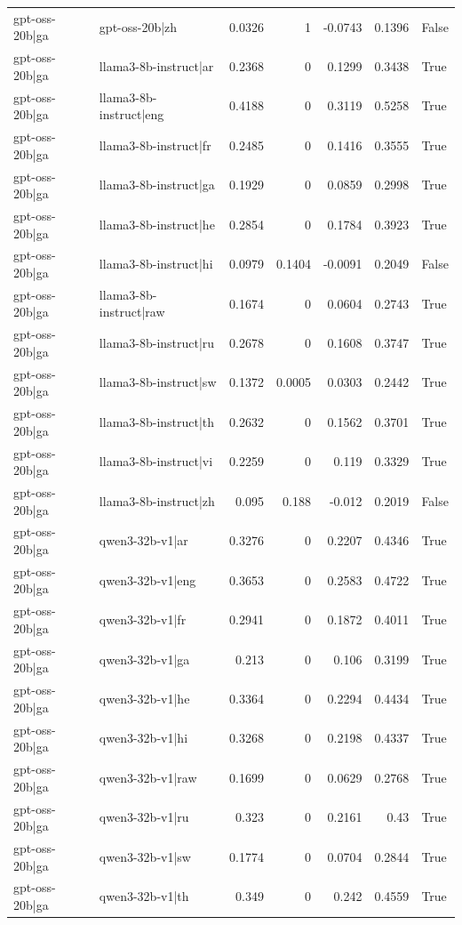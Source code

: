 \begin{table}
\begin{tabular}{l l r r r r l}
gpt-oss-20b|ga & gpt-oss-20b|zh & 0.0326 & 1 & -0.0743 & 0.1396 & False \\
gpt-oss-20b|ga & llama3-8b-instruct|ar & 0.2368 & 0 & 0.1299 & 0.3438 & True \\
gpt-oss-20b|ga & llama3-8b-instruct|eng & 0.4188 & 0 & 0.3119 & 0.5258 & True \\
gpt-oss-20b|ga & llama3-8b-instruct|fr & 0.2485 & 0 & 0.1416 & 0.3555 & True \\
gpt-oss-20b|ga & llama3-8b-instruct|ga & 0.1929 & 0 & 0.0859 & 0.2998 & True \\
gpt-oss-20b|ga & llama3-8b-instruct|he & 0.2854 & 0 & 0.1784 & 0.3923 & True \\
gpt-oss-20b|ga & llama3-8b-instruct|hi & 0.0979 & 0.1404 & -0.0091 & 0.2049 & False \\
gpt-oss-20b|ga & llama3-8b-instruct|raw & 0.1674 & 0 & 0.0604 & 0.2743 & True \\
gpt-oss-20b|ga & llama3-8b-instruct|ru & 0.2678 & 0 & 0.1608 & 0.3747 & True \\
gpt-oss-20b|ga & llama3-8b-instruct|sw & 0.1372 & 0.0005 & 0.0303 & 0.2442 & True \\
gpt-oss-20b|ga & llama3-8b-instruct|th & 0.2632 & 0 & 0.1562 & 0.3701 & True \\
gpt-oss-20b|ga & llama3-8b-instruct|vi & 0.2259 & 0 & 0.119 & 0.3329 & True \\
gpt-oss-20b|ga & llama3-8b-instruct|zh & 0.095 & 0.188 & -0.012 & 0.2019 & False \\
gpt-oss-20b|ga & qwen3-32b-v1|ar & 0.3276 & 0 & 0.2207 & 0.4346 & True \\
gpt-oss-20b|ga & qwen3-32b-v1|eng & 0.3653 & 0 & 0.2583 & 0.4722 & True \\
gpt-oss-20b|ga & qwen3-32b-v1|fr & 0.2941 & 0 & 0.1872 & 0.4011 & True \\
gpt-oss-20b|ga & qwen3-32b-v1|ga & 0.213 & 0 & 0.106 & 0.3199 & True \\
gpt-oss-20b|ga & qwen3-32b-v1|he & 0.3364 & 0 & 0.2294 & 0.4434 & True \\
gpt-oss-20b|ga & qwen3-32b-v1|hi & 0.3268 & 0 & 0.2198 & 0.4337 & True \\
gpt-oss-20b|ga & qwen3-32b-v1|raw & 0.1699 & 0 & 0.0629 & 0.2768 & True \\
gpt-oss-20b|ga & qwen3-32b-v1|ru & 0.323 & 0 & 0.2161 & 0.43 & True \\
gpt-oss-20b|ga & qwen3-32b-v1|sw & 0.1774 & 0 & 0.0704 & 0.2844 & True \\
gpt-oss-20b|ga & qwen3-32b-v1|th & 0.349 & 0 & 0.242 & 0.4559 & True \\

\end{tabular}
\end{table}
